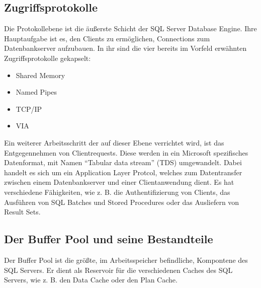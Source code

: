        \subsection{Zugriffsprotokolle}
        Die Protokollebene ist die äußerste Schicht der SQL Server Database
        Engine. Ihre Hauptaufgabe ist es, den Clients zu ermöglichen,
        Connections zum Datenbankserver aufzubauen. In ihr sind die
        vier bereits im Vorfeld erwähnten Zugriffsprotokolle gekapselt:
        \begin{itemize}
            \item Shared Memory
            \item Named Pipes
            \item TCP/IP
            \item VIA
        \end{itemize}  
        Ein weiterer Arbeitsschritt der auf dieser Ebene verrichtet
        wird, ist das Entgegennehmen von Clientrequests. Diese werden in ein
        Microsoft spezifisches Datenformat, mit Namen \enquote{Tabular data
        stream} (TDS) umgewandelt. Dabei handelt es sich um ein Application
        Layer Protcol, welches zum Datentransfer zwischen einem Datenbankserver
        und einer Clientanwendung dient. Es hat verschiedene Fähigkeiten, wie z.
        B. die Authentifizierung von Clients, das Ausführen von SQL Batches und
        Stored Procedures oder das Ausliefern von Result Sets.
        \begin{literaturinternet}
          \item \cite{dd304523}
        \end{literaturinternet}
      \subsection{Der Buffer Pool und seine Bestandteile}
        Der Buffer Pool ist die größte, im Arbeitsspeicher befindliche,
        Kompontene des SQL Servers. Er dient als Reservoir für die
        verschiedenen Caches des SQL Servers, wie z. B. den Data Cache oder den Plan Cache.
